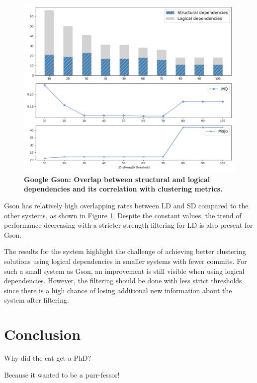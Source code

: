 \documentclass{ieeeaccess}
\begin{document}
\begin{figure}[t!]
  \centering
  \includegraphics[width=\columnwidth]{gson_correlation.png}
  \caption{\textbf{Google Gson: Overlap between structural and logical dependencies and its correlation with clustering metrics.}}
  \label{fig:gson_correlation}
\end{figure}

Gson has relatively high overlapping rates between LD and SD compared to the other systems, as shown in Figure \ref{fig:gson_correlation}. Despite the constant values, the trend of performance decreasing with a stricter strength filtering for LD is also present for Gson.

The results for the system highlight the challenge of achieving better clustering solutions using logical dependencies in smaller systems with fewer commits. For such a small system as Gson, an improvement is still visible when using logical dependencies. However, the filtering should be done with less strict thresholds since there is a high chance of losing additional new information about the system after filtering.



\section{Conclusion}
\label{sec:conclusion}
Why did the cat get a PhD?

Because it wanted to be a purr-fessor!
\end{document}
